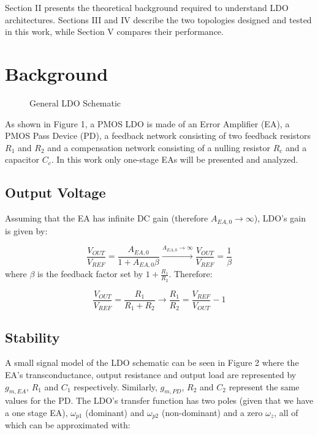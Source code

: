 \documentclass[journal]{IEEEtran}
\newcommand{\svg}[3]{
    \begin{figure}[!h]
        \centering
        
        \caption{#2}
    \end{figure}
}
\begin{document}
Section II presents the theoretical background required to understand LDO architectures. Sections III and IV describe the two topologies designed and tested in this work, while Section V compares their performance.

\section{Background}

\svg{../images/pmos_ldo.svg}{General LDO Schematic}{0.8}

As shown in Figure 1, a PMOS LDO is made of an Error Amplifier (EA), a PMOS Pass Device (PD), a feedback network consisting of two feedback resistors $R_1$ and $R_2$ and a compensation network consisting of a nulling resistor $R_c$ and a capacitor $C_c$. In this work only one-stage EAs will be presented and analyzed.

\subsection{Output Voltage}
Assuming that the EA has infinite DC gain (therefore $A_{EA,0} \rightarrow \infty$), LDO's gain is given by:

\begin{equation}
    \frac{V_{OUT}}{V_{REF}} = \frac{A_{EA,0}}{1+A_{EA,0} \beta} \xrightarrow{A_{EA,0} \rightarrow \infty} \frac{V_{OUT}}{V_{REF}} = \frac{1}{\beta}
\end{equation}
where $\beta$ is the feedback factor set by $1 + \frac{R_1}{R_2}$. Therefore:

\begin{equation}
    \frac{V_{OUT}}{V_{REF}} = \frac{R_1}{R_1+R_2} \rightarrow \frac{R_1}{R_2} = \frac{V_{REF}}{V_{OUT}} - 1
\end{equation}

\subsection{Stability}

A small signal model of the LDO schematic can be seen in Figure 2 where the EA's transconductance, output resistance and output load are represented by $g_{m,EA}$, $R_1$ and $C_1$ respectively. Similarly, $g_{m,PD}$, $R_2$ and $C_2$ represent the same values for the PD. The LDO's transfer function has two poles (given that we have a one stage EA), $\omega_{p1}$ (dominant) and $\omega_{p2}$ (non-dominant) and a zero $\omega_{z}$, all of which can be approximated with:
\end{document}
